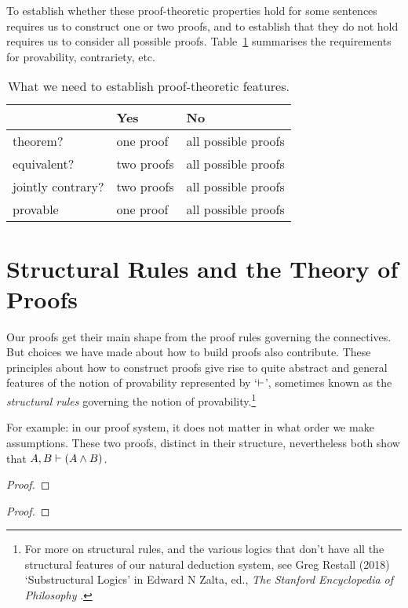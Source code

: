 To establish whether these proof-theoretic properties hold for some sentences requires us to construct one or two proofs, and to establish that they do not hold requires us to consider all possible proofs. Table~\ref{proofstable} summarises the requirements for provability, contrariety, etc.
\begin{table}[b]
\begin{tabular}{l l l} \toprule 
 & \textbf{Yes} & \textbf{No}\\
 \midrule
theorem? & one proof & all possible proofs\\
equivalent? & two proofs & all possible proofs\\
jointly contrary? & two proofs & all possible proofs\\
provable & one proof & all possible proofs\\
\bottomrule \end{tabular}
\caption{What we need to establish proof-theoretic features.\label{proofstable}}
\end{table}


\section{Structural Rules and the Theory of Proofs}\label{s:substructural}

Our proofs get their main shape from the proof rules governing the connectives. But choices we have made about how to build proofs also contribute. These principles about how to construct proofs give rise to quite abstract and general features of the notion of provability represented by `$\vdash$', sometimes known as the \emph{structural rules} governing the notion of provability.\footnote{For more on structural rules, and the various logics that don't have all the structural features of our natural deduction system, see Greg Restall (2018) `Substructural Logics' in Edward N Zalta, ed., \emph{The Stanford Encyclopedia of Philosophy} .}

For example: in our proof system, it does not matter in what order we make assumptions. These two proofs, distinct in their structure, nevertheless both show that $A, B \vdash (A \wedge B)$. 
\begin{multicols}{2}\noindent\begin{proof}
	\open
\end{proof}\qquad \begin{proof}
	\open
\end{proof}\end{multicols} 

